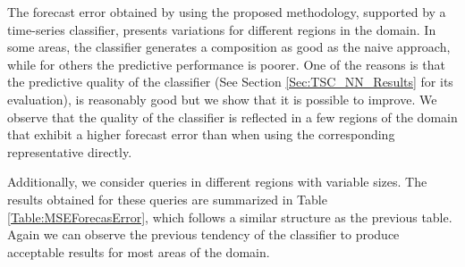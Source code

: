 The forecast error obtained by using the proposed methodology, supported by a time-series classifier, presents variations for different regions in the domain. In some areas, the classifier generates a composition as good as the naive approach, while for others the predictive performance is poorer. One of the reasons is that the predictive quality of the classifier (See Section \ref{Sec:TSC_NN_Results} for its evaluation), is reasonably good but we show that it is possible to improve. We observe that the quality of the classifier is reflected in a few regions of the domain that exhibit a higher forecast error than when using the corresponding representative directly.

Additionally, we consider queries in different regions with variable sizes. The results obtained for these queries are summarized in Table \ref{Table:MSEForecasError}, which follows a similar structure as the previous table. Again we can observe the previous tendency of the classifier to produce acceptable results for most areas of the domain.

